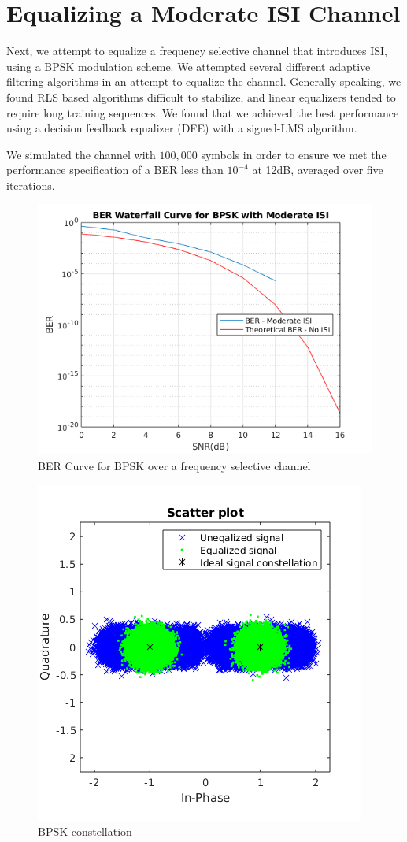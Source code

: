 \documentclass[conference]{IEEEtran}
\begin{document}
\section{Equalizing a Moderate ISI Channel}
Next, we attempt to equalize a frequency selective channel that introduces ISI, using a BPSK modulation scheme. We attempted several different adaptive filtering algorithms in an attempt to equalize the channel. Generally speaking, we found RLS based algorithms difficult to stabilize, and linear equalizers tended to require long training sequences. We found that we achieved the best performance using a decision feedback equalizer (DFE) with a signed-LMS algorithm.

We simulated the channel with $100,000$ symbols in order to ensure we met the performance specification of a BER less than $10^{-4}$ at 12dB, averaged over five iterations. 
\begin{figure}[htbp]
\centerline{\includegraphics[scale=.4]{./media/bpsk.png}}
\caption{BER Curve for BPSK over a frequency selective channel}
\label{16ber}
\end{figure}
\begin{figure}[htbp]
\centerline{\includegraphics[scale=.4]{./media/bpsk_scatter.png}}
\caption{BPSK constellation}
\label{16star}
\end{figure}
\end{document}
